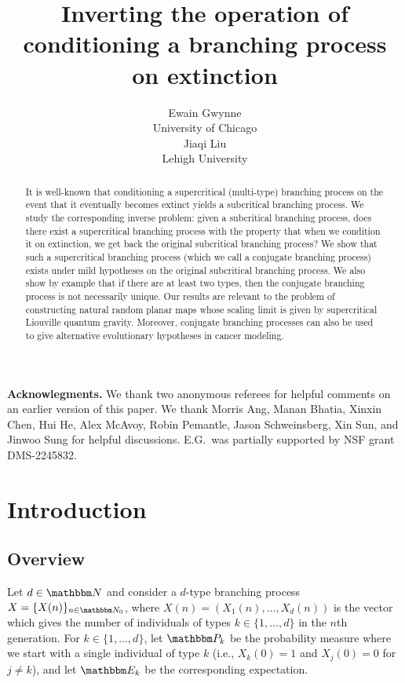 \documentclass[11pt]{article}
\title{Inverting the operation of conditioning a branching process on extinction}
\date{ }
\author{
\begin{tabular}{c} Ewain Gwynne\\[-3pt]\small University of Chicago \end{tabular}
\begin{tabular}{c} Jiaqi Liu\\[-3pt]\small Lehigh University \end{tabular}  
}
\theoremstyle{plain}
\theoremstyle{definition}
\numberwithin{equation}{section}
\newcommand{\BB}{\mathbbm}
\begin{document}
\maketitle

\begin{abstract}
It is well-known that conditioning a supercritical (multi-type) branching process on the event that it eventually becomes extinct yields a subcritical branching process. We study the corresponding inverse problem: given a subcritical branching process, does there exist a supercritical branching process with the property that when we condition it on extinction, we get back the original subcritical branching process? We show that such a supercritical branching process (which we call a conjugate branching process) exists under mild hypotheses on the original subcritical branching process. We also show by example that if there are at least two types, then the conjugate branching process is not necessarily unique. Our results are relevant to the problem of constructing natural random planar maps whose scaling limit is given by supercritical Liouville quantum gravity. Moreover, conjugate branching processes can also be used to give alternative evolutionary hypotheses in cancer modeling. 
\end{abstract}

\tableofcontents


\bigskip
\noindent\textbf{Acknowlegments.} {We thank two anonymous referees for helpful comments on an earlier version of this paper.} We thank Morris Ang, Manan Bhatia, Xinxin Chen, Hui He, Alex McAvoy, Robin Pemantle, Jason Schweinsberg, Xin Sun, and Jinwoo Sung for helpful discussions. E.G.\ was partially supported by NSF grant DMS-2245832. 

\section{Introduction}
\label{sec-intro}

\subsection{Overview}
\label{sec-overview}

Let $d\in\BB N$ and consider a $d$-type branching process $X = \{X(n) \}_{n\in\BB N_0}$, where $X(n) = (X_1(n) , \dots, X_d(n))$ is the vector which gives the number of individuals of types $k\in \{1,\dots,d\}$ in the $n$th generation. 
For $k\in \{1,\dots,d\}$, let $\BB P_k$ be the probability measure where we start with a single individual of type $k$ (i.e., $X_k(0) = 1$ and $X_j(0) = 0$ for $j\not=k$), and let $\BB E_k$ be the corresponding expectation. 
\end{document}
